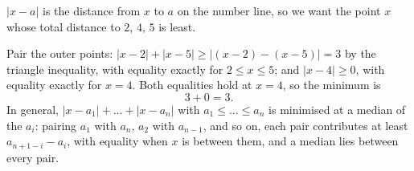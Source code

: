 $|x-a|$ is the distance from $x$ to $a$ on the number line, so we want the point $x$ whose total distance to $2$, $4$, $5$ is least.

Pair the outer points: $|x-2|+|x-5|\ge|(x-2)-(x-5)|=3$ by the triangle inequality, with equality exactly for $2\le x\le5$; and $|x-4|\ge0$, with equality exactly for $x=4$. Both equalities hold at $x=4$, so the minimum is
\[
3+0=\boxed{3}.
\]
In general, $|x-a_1|+\dots+|x-a_n|$ with $a_1\le\dots\le a_n$ is minimised at a median of the $a_i$: pairing $a_1$ with $a_n$, $a_2$ with $a_{n-1}$, and so on, each pair contributes at least $a_{n+1-i}-a_i$, with equality when $x$ is between them, and a median lies between every pair.
